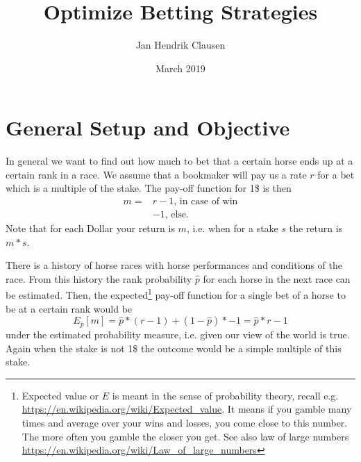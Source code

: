 \documentclass{article}
\title{Optimize Betting Strategies}
\author{Jan Hendrik Clausen}
\date{March 2019}
\begin{document}
\maketitle

\section{General Setup and Objective}
In general we want to find out how much to bet that a certain horse ends up at a certain rank in a race. 
We assume that a bookmaker will pay us a rate $r$ for a bet which is a multiple of the stake. The pay-off function for 1\$ is then
\begin{align*}
  m = & r-1 \text{, in case of win} \\
      & -1 \text{, else.}
\end{align*}
Note that for each Dollar your return is $m$, i.e. when for a stake $s$ the return is $m*s$.


There is a history of horse races with horse performances and conditions of the race. From this history the rank probability $\hat p$ for each horse in the next race can be estimated. Then, the expected\footnote{Expected value or $E$ is meant in the sense of probability theory, recall e.g. \href{Exprected-Value-Wiki}{https://en.wikipedia.org/wiki/Expected\_value}. It means if you gamble many times and average over your wins and losses, you come close to this number. The more often you gamble the closer you get. See also law of large numbers \href{LLN-Wiki}{https://en.wikipedia.org/wiki/Law\_of\_large\_numbers}} pay-off function for a single bet of a horse to be at a certain rank would be
\begin{equation}\label{eq:expectation}
 E_{\hat p}[m] = \hat p * (r-1) + (1- \hat p) * -1 = \hat p *r -1
\end{equation}
under the estimated probability measure, i.e. given our view of the world is true. Again when the stake is not 1\$ the outcome would be a simple multiple of this stake.
\end{document}
